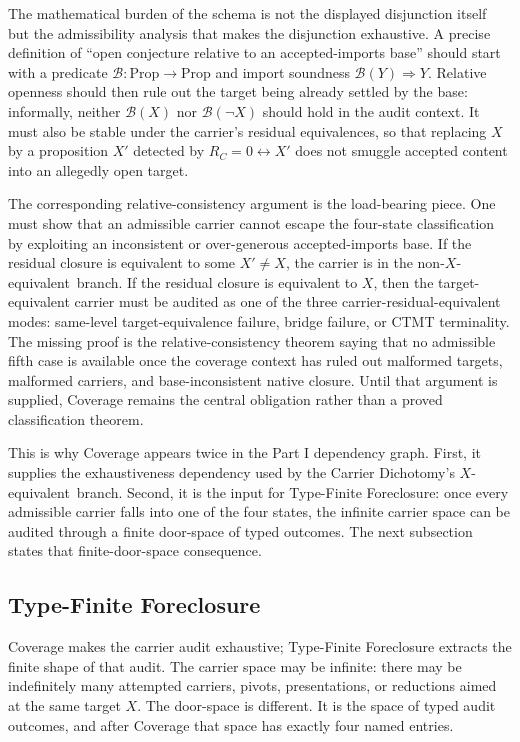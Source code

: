 \documentclass[11pt]{article}
\newcommand{\Xequiv}{$X$-equivalent}
\newcommand{\nonXequiv}{non-$X$-equivalent}
\theoremstyle{definition}
\begin{document}
The mathematical burden of the schema is not the displayed disjunction
itself but the admissibility analysis that makes the disjunction
exhaustive.  A precise definition of ``open conjecture relative to an
accepted-imports base'' should start with a predicate
\(\mathcal B:\mathrm{Prop}\to\mathrm{Prop}\) and import soundness
\(\mathcal B(Y)\Rightarrow Y\).  Relative openness should then rule out
the target being already settled by the base: informally, neither
\(\mathcal B(X)\) nor \(\mathcal B(\neg X)\) should hold in the audit
context.  It must also be stable under the carrier's residual
equivalences, so that replacing \(X\) by a proposition \(X'\) detected
by \(R_C=0\leftrightarrow X'\) does not smuggle accepted content into
an allegedly open target.

The corresponding relative-consistency argument is the load-bearing
piece.  One must show that an admissible carrier cannot escape the
four-state classification by exploiting an inconsistent or
over-generous accepted-imports base.  If the residual closure is
equivalent to some \(X'\neq X\), the carrier is in the
\nonXequiv\ branch.  If the residual closure is equivalent to \(X\),
then the target-equivalent carrier must be audited as one of the
three carrier-residual-equivalent modes: same-level target-equivalence
failure, bridge failure, or CTMT terminality.  The missing proof is the
relative-consistency theorem saying that no admissible fifth case is
available once the coverage context has ruled out malformed targets,
malformed carriers, and base-inconsistent native closure.  Until that
argument is supplied, Coverage remains the central obligation rather
than a proved classification theorem.

This is why Coverage appears twice in the Part I dependency graph.
First, it supplies the exhaustiveness dependency used by the Carrier
Dichotomy's \Xequiv\ branch.  Second, it is the input for Type-Finite
Foreclosure: once every admissible carrier falls into one of the four
states, the infinite carrier space can be audited through a finite
door-space of typed outcomes.  The next subsection states that
finite-door-space consequence.

\subsection{Type-Finite Foreclosure}\label{sec:foreclosure:type-finite}

Coverage makes the carrier audit exhaustive; Type-Finite Foreclosure
extracts the finite shape of that audit.  The carrier space may be
infinite: there may be indefinitely many attempted carriers, pivots,
presentations, or reductions aimed at the same target \(X\).  The
door-space is different.  It is the space of typed audit outcomes, and
after Coverage that space has exactly four named entries.
\end{document}
